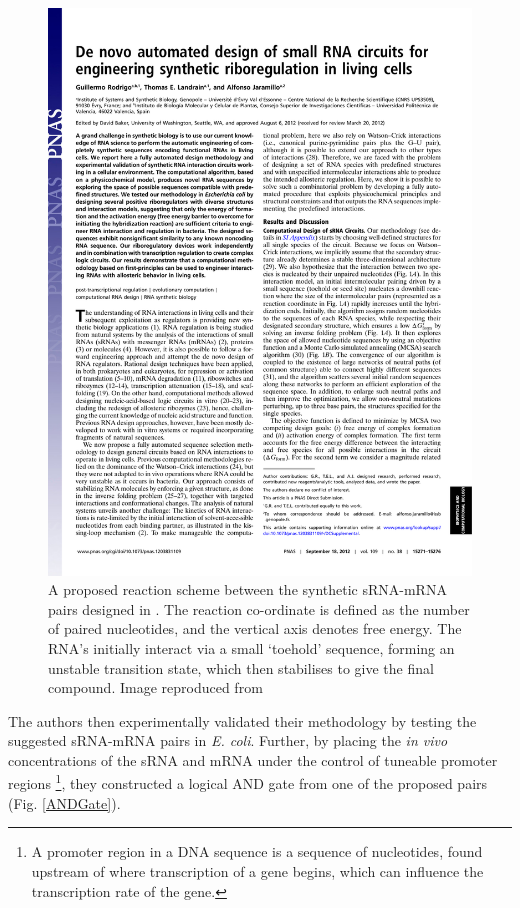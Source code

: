 \documentclass[10pt,journal]{./IEEE_latex_class/IEEEtran}
\begin{document}
\begin{figure}[h]
\centering
\includegraphics[trim = 60 630 300 30,page=2,clip = true]{pnas1203831109.pdf}
\caption{A proposed reaction scheme between the synthetic sRNA-mRNA pairs designed in \cite{Rodrigo2012}. The reaction co-ordinate is defined as the number of paired nucleotides, and the vertical axis denotes free energy. The RNA's initially interact via a small 
`toehold' sequence, forming an unstable transition state, which then stabilises to give the final compound. Image reproduced from \cite{Rodrigo2012}}
\label{reactionscheme}
\end{figure}

The authors then experimentally validated their methodology by testing the suggested sRNA-mRNA pairs in \textit{E. coli}.  Further, by placing the \textit{in vivo}  concentrations of the sRNA and mRNA under the control of tuneable promoter regions \footnote{A promoter region in a DNA sequence is a sequence of nucleotides, found upstream of where transcription of a gene begins, which can influence the transcription rate of the gene.}, they constructed a logical AND gate from one of the proposed pairs (Fig. \ref{ANDGate}). 
\end{document}

